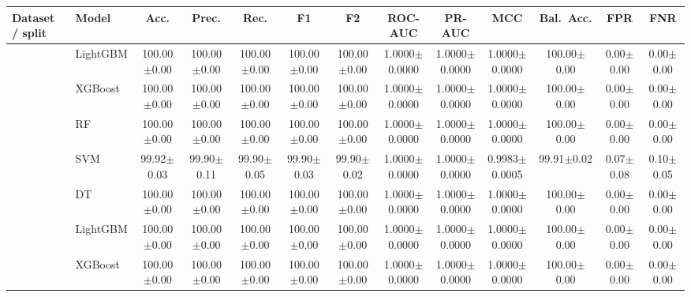 \begin{tabular}{@{}llccccccccccc@{}}
\toprule
\textbf{Dataset / split} & \textbf{Model} & \textbf{Acc.} & \textbf{Prec.} & \textbf{Rec.} & \textbf{F1} & \textbf{F2} & \textbf{ROC-AUC} & \textbf{PR-AUC} & \textbf{MCC} & \textbf{Bal.\ Acc.} & \textbf{FPR} & \textbf{FNR}\\
\midrule
{} & LightGBM & 100.00{\tiny$\pm$0.00} & 100.00{\tiny$\pm$0.00} & 100.00{\tiny$\pm$0.00} & 100.00{\tiny$\pm$0.00} & 100.00{\tiny$\pm$0.00} & 1.0000{\tiny$\pm$0.0000} & 1.0000{\tiny$\pm$0.0000} & 1.0000{\tiny$\pm$0.0000} & 100.00{\tiny$\pm$0.00} & 0.00{\tiny$\pm$0.00} & 0.00{\tiny$\pm$0.00}\\
 & XGBoost & 100.00{\tiny$\pm$0.00} & 100.00{\tiny$\pm$0.00} & 100.00{\tiny$\pm$0.00} & 100.00{\tiny$\pm$0.00} & 100.00{\tiny$\pm$0.00} & 1.0000{\tiny$\pm$0.0000} & 1.0000{\tiny$\pm$0.0000} & 1.0000{\tiny$\pm$0.0000} & 100.00{\tiny$\pm$0.00} & 0.00{\tiny$\pm$0.00} & 0.00{\tiny$\pm$0.00}\\
 & RF & 100.00{\tiny$\pm$0.00} & 100.00{\tiny$\pm$0.00} & 100.00{\tiny$\pm$0.00} & 100.00{\tiny$\pm$0.00} & 100.00{\tiny$\pm$0.00} & 1.0000{\tiny$\pm$0.0000} & 1.0000{\tiny$\pm$0.0000} & 1.0000{\tiny$\pm$0.0000} & 100.00{\tiny$\pm$0.00} & 0.00{\tiny$\pm$0.00} & 0.00{\tiny$\pm$0.00}\\
 & SVM & 99.92{\tiny$\pm$0.03} & 99.90{\tiny$\pm$0.11} & 99.90{\tiny$\pm$0.05} & 99.90{\tiny$\pm$0.03} & 99.90{\tiny$\pm$0.02} & 1.0000{\tiny$\pm$0.0000} & 1.0000{\tiny$\pm$0.0000} & 0.9983{\tiny$\pm$0.0005} & 99.91{\tiny$\pm$0.02} & 0.07{\tiny$\pm$0.08} & 0.10{\tiny$\pm$0.05}\\
 & DT & 100.00{\tiny$\pm$0.00} & 100.00{\tiny$\pm$0.00} & 100.00{\tiny$\pm$0.00} & 100.00{\tiny$\pm$0.00} & 100.00{\tiny$\pm$0.00} & 1.0000{\tiny$\pm$0.0000} & 1.0000{\tiny$\pm$0.0000} & 1.0000{\tiny$\pm$0.0000} & 100.00{\tiny$\pm$0.00} & 0.00{\tiny$\pm$0.00} & 0.00{\tiny$\pm$0.00}\\
\midrule
{} & LightGBM & 100.00{\tiny$\pm$0.00} & 100.00{\tiny$\pm$0.00} & 100.00{\tiny$\pm$0.00} & 100.00{\tiny$\pm$0.00} & 100.00{\tiny$\pm$0.00} & 1.0000{\tiny$\pm$0.0000} & 1.0000{\tiny$\pm$0.0000} & 1.0000{\tiny$\pm$0.0000} & 100.00{\tiny$\pm$0.00} & 0.00{\tiny$\pm$0.00} & 0.00{\tiny$\pm$0.00}\\
 & XGBoost & 100.00{\tiny$\pm$0.00} & 100.00{\tiny$\pm$0.00} & 100.00{\tiny$\pm$0.00} & 100.00{\tiny$\pm$0.00} & 100.00{\tiny$\pm$0.00} & 1.0000{\tiny$\pm$0.0000} & 1.0000{\tiny$\pm$0.0000} & 1.0000{\tiny$\pm$0.0000} & 100.00{\tiny$\pm$0.00} & 0.00{\tiny$\pm$0.00} & 0.00{\tiny$\pm$0.00}\\

\end{tabular}
